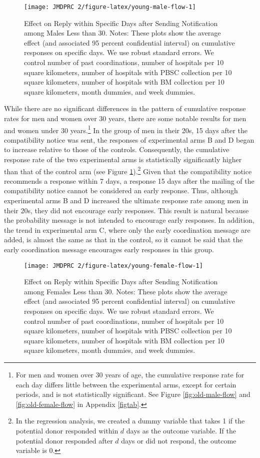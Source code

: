 \documentclass[12pt, a4paper]{article}
\begin{document}
\begin{figure}[t]
\texttt{[image: JMDPRC~2/figure-latex/young-male-flow-1]} \caption{Effect on Reply within Specific Days after Sending Notification among Males Less than 30. Notes: These plots show the average effect (and associated 95 percent confidential interval) on cumulative responses on specific days. We use robust standard errors. We control number of past coordinations, number of hospitals per 10 square kilometers, number of hospitals with PBSC collection per 10 square kilometers, number of hospitals with BM collection per 10 square kilometers, month dummies, and week dummies.}\label{fig:young-male-flow}
\end{figure}

While there are no significant differences in the pattern of cumulative response rates for men and women over 30 years, there are some notable results for men and women under 30 years.\footnote{For men and women over 30 years of age, the cumulative response rate for each day differs little between the experimental arms, except for certain periods, and is not statistically significant. See Figure \ref{fig:old-male-flow} and \ref{fig:old-female-flow} in Appendix \ref{figtab}.} In the group of men in their 20s, 15 days after the compatibility notice was sent, the responses of experimental arms B and D began to increase relative to those of the controls. Consequently, the cumulative response rate of the two experimental arms is statistically significantly higher than that of the control arm (see Figure \ref{fig:young-male-flow}).\footnote{In the regression analysis, we created a dummy variable that takes 1 if the potential donor responded within \(d\) days as the outcome variable. If the potential donor responded after \(d\) days or did not respond, the outcome variable is 0.} Given that the compatibility notice recommends a response within 7 days, a response 15 days after the mailing of the compatibility notice cannot be considered an early response. Thus, although experimental arms B and D increased the ultimate response rate among men in their 20s, they did not encourage early responses. This result is natural because the probability message is not intended to encourage early responses. In addition, the trend in experimental arm C, where only the early coordination message are added, is almost the same as that in the control, so it cannot be said that the early coordination message encourages early responses in this group.

\begin{figure}[t]
\texttt{[image: JMDPRC~2/figure-latex/young-female-flow-1]} \caption{Effect on Reply within Specific Days after Sending Notification among Females Less than 30. Notes: These plots show the average effect (and associated 95 percent confidential interval) on cumulative responses on specific days. We use robust standard errors. We control number of past coordinations, number of hospitals per 10 square kilometers, number of hospitals with PBSC collection per 10 square kilometers, number of hospitals with BM collection per 10 square kilometers, month dummies, and week dummies.}\label{fig:young-female-flow}
\end{figure}
\end{document}
